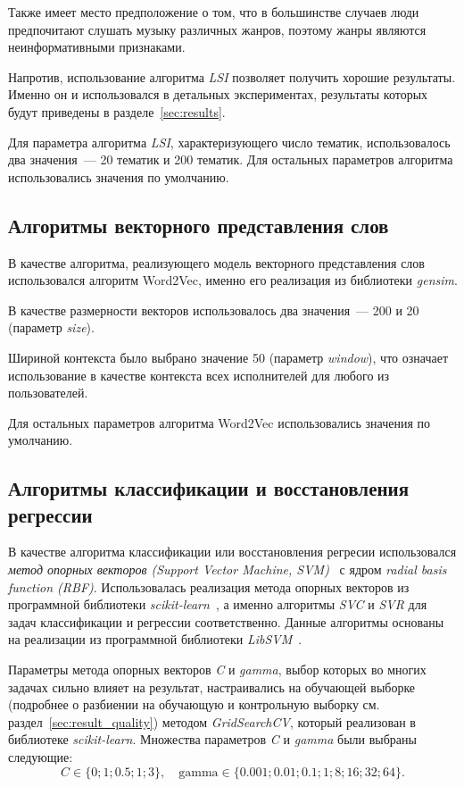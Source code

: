 Также имеет место предположение о том, что в большинстве случаев
люди предпочитают слушать музыку различных жанров, поэтому жанры
являются неинформативными признаками.

Напротив, использование алгоритма \textit{LSI} позволяет получить хорошие
результаты. Именно он и использовался в детальных экспериментах, результаты
которых будут приведены в разделе~\ref{sec:results}.

Для параметра алгоритма \textit{LSI}, характеризующего число тематик,
использовалось два значения~--- 20 тематик и 200 тематик. 
Для остальных параметров алгоритма использовались значения по умолчанию.

\subsection{Алгоритмы векторного представления слов}

В качестве алгоритма, реализующего модель векторного представления
слов использовался алгоритм Word2Vec, именно его реализация из
библиотеки \textit{gensim}.  

В качестве размерности векторов использовалось два значения~--- 200
и 20 (параметр \textit{size}).

Шириной контекста было выбрано значение 50 (параметр \textit{window}),
что означает использование в качестве контекста всех исполнителей для
любого из пользователей.

Для остальных параметров алгоритма Word2Vec использовались значения
по умолчанию.

\subsection{Алгоритмы классификации и восстановления регрессии}

В качестве алгоритма классификации или восстановления регресии
использовался \textit{метод опорных векторов (Support Vector Machine,
SVM)}~\cite{cortes1995support} с ядром 
\textit{radial basis function (RBF)}. Использовалась реализация
метода опорных векторов из программной библиотеки 
\textit{scikit-learn}~\cite{sklearn}, а именно алгоритмы
\textit{SVC} и \textit{SVR} для задач классификации и регрессии
соответственно. Данные алгоритмы основаны на реализации
из программной библиотеки \textit{LibSVM}~\cite{libsvm}.

Параметры метода опорных векторов \textit{C} и \textit{gamma},
выбор которых во многих задачах сильно влияет на результат,
настраивались на обучающей выборке (подробнее о разбиении
на обучающую и контрольную выборку см.
раздел~\ref{sec:result_quality}) методом \textit{GridSearchCV},
который реализован в библиотеке \textit{scikit-learn}. Множества
параметров \textit{C} и \textit{gamma} были выбраны следующие:
\[
    C \in \{0; 1; 0.5; 1; 3\},\quad
    \mathrm{gamma} \in \{0.001; 0.01; 0.1; 1; 8; 16; 32; 64\}.
\]


